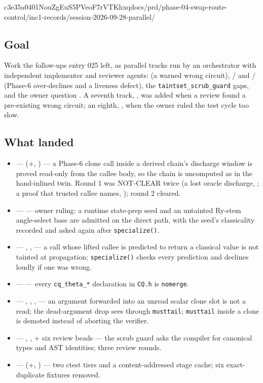 %
  {c3e35a04}{01NouZgEuS5PVeoF7rVTKhxq}{docs/prd/phase-04-swap-route-control/inc1-records/session-2026-09-28-parallel/}

\subsection*{Goal}
Work the follow-ups entry 025 left, as parallel tracks run by an orchestrator
with independent implementer and reviewer agents:  (a warned wrong
circuit), / and / (Phase-6 over-declines and
a liveness defect), the \texttt{taintset\_scrub\_guard} gaps, and the owner
question . A seventh track, , was added when a review found a
pre-existing wrong circuit; an eighth, , when the owner ruled the test
cycle too slow.

\subsection*{What landed}
\begin{itemize}
  \item {} ---  (+, ) --- a Phase-6 clone
    call inside a derived chain's discharge window is proved read-only from the
    callee body, so the chain is uncomputed as in the hand-inlined twin. Round 1
    was NOT-CLEAR twice (a lost oracle discharge, ; a proof that trusted
    callee names, ); round 2 cleared.
  \item {} ---  --- owner ruling: a runtime state-prep seed
    and an untainted Ry-stem angle-select base are admitted on the direct path,
    with the seed's classicality recorded and asked again after
    \texttt{specialize()}.
  \item {} --- , ,  --- a call whose
    lifted callee is predicted to return a classical value is not tainted at
    propagation; \texttt{specialize()} checks every prediction and declines loudly
    if one was wrong.
  \item {} ---  --- every \texttt{cq\_theta\_*}
    declaration in \texttt{CQ.h} is \texttt{nomerge}.
  \item {} --- , , ,  --- an
    argument forwarded into an unread scalar clone slot is not a read; the
    dead-argument drop sees through \texttt{musttail}; \texttt{musttail} inside a
    clone is demoted instead of aborting the verifier.
  \item {} --- , ,  + six review beads ---
    the scrub guard asks the compiler for canonical types and AST identities;
    three review rounds.
  \item {} ---  (+, ) --- two ctest tiers
    and a content-addressed stage cache; six exact-duplicate fixtures removed.
\end{itemize}

